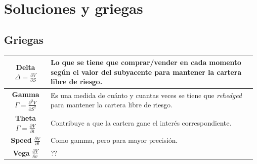 
\section{Soluciones y griegas}


\subsection{Griegas}
\begin{center}
    \begin{tabularx}{\textwidth}{|c|X|}
        \hline
        \textbf{Delta} $\Delta = \frac{\partial V}{\partial S}$ &  Lo que se tiene que comprar/vender en cada momento según el valor del subyacente para mantener la cartera libre de riesgo. \\
        \hline
        \textbf{Gamma} $\Gamma = \frac{\partial^2 V}{\partial S^2}$ & Es una medida de cuánto y cuantas veces se tiene que \textit{rehedged} para mantener la cartera libre de riesgo. \\
        \hline
        \textbf{Theta} $\Gamma = \frac{\partial V}{\partial t}$ & Contribuye a que la cartera gane el interés correspondiente. \\
        \hline
        \textbf{Speed} $\frac{\partial V}{\partial t}$ & Como gamma, pero para mayor precisión. \\
        \hline
        \textbf{Vega} $\frac{\partial V}{\partial \sigma}$ & ?? \\
        \hline
    \end{tabularx}
\end{center}



